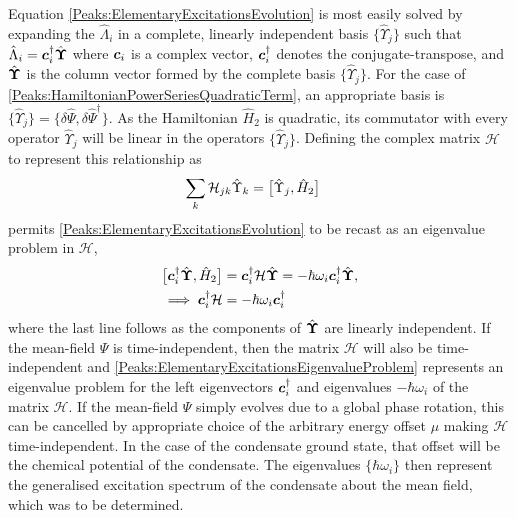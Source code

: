 Equation \eqref{Peaks:ElementaryExcitationsEvolution} is most easily solved by expanding the $\hat{\Lambda}_i$ in a complete, linearly independent basis $\{\hat{\Upsilon}_j\}$ such that $\hat{\Lambda}_i = \bm{c}_i^\dagger \hat{\bm{\Upsilon}}$ where $\bm{c}_i$ is a complex vector, $\bm{c}_i^\dagger$ denotes the conjugate-transpose, and $\hat{\bm{\Upsilon}}$ is the column vector formed by the complete basis $\{\hat{\Upsilon}_j\}$. For the case of \eqref{Peaks:HamiltonianPowerSeriesQuadraticTerm}, an appropriate basis is $\{\hat{\Upsilon}_j\} = \{\delta\hat{\Psi}, \delta\hat{\Psi}^\dagger\}$. As the Hamiltonian $\hat{H}_2$ is quadratic, its commutator with every operator $\hat{\Upsilon}_j$ will be linear in the operators $\{\hat{\Upsilon}_j\}$. Defining the complex matrix $\mathcal{H}$ to represent this relationship as
\begin{align}
    \label{Peaks:ScriptHRelationshipToHamiltonian}
    \sum_k \mathcal{H}_{jk} \hat{\Upsilon}_k &= \comm{\hat{\Upsilon}_j, \hat{H}_2}
\end{align}
permits \eqref{Peaks:ElementaryExcitationsEvolution} to be recast as an eigenvalue problem in $\mathcal{H}$,
\begin{align}
    \comm{\vect{c}_i^\dagger \hat{\vect{\Upsilon}}, \hat{H}_2} &= \vect{c}_i^\dagger \mathcal{H} \hat{\vect{\Upsilon}} = - \hbar \omega_i \vect{c}_i^\dagger \hat{\vect{\Upsilon}}, \label{Peaks:ElementaryExcitationsEigenvalueProblemWithOperators}\\
    \implies \vect{c}_i^\dagger \mathcal{H} &= - \hbar \omega_i \vect{c}_i^\dagger \label{Peaks:ElementaryExcitationsEigenvalueProblem}
\end{align}
where the last line follows as the components of $\hat{\bm{\Upsilon}}$ are linearly independent. If the mean-field $\Psi$ is time-independent, then the matrix $\mathcal{H}$ will also be time-independent and \eqref{Peaks:ElementaryExcitationsEigenvalueProblem} represents an eigenvalue problem for the left eigenvectors $\bm{c}_i^\dagger$ and eigenvalues $-\hbar \omega_i$ of the matrix $\mathcal{H}$. If the mean-field $\Psi$ simply evolves due to a global phase rotation, this can be cancelled by appropriate choice of the arbitrary energy offset $\mu$ making $\mathcal{H}$ time-independent.  In the case of the condensate ground state, that offset will be the chemical potential of the condensate. The eigenvalues $\{\hbar \omega_i\}$ then represent the generalised excitation spectrum of the condensate about the mean field, which was to be determined. 

